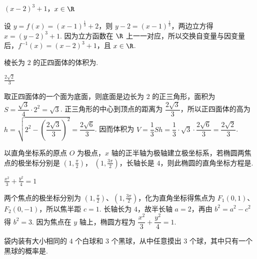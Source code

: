 \begin{answer}
\((x-2)^3+1\)，\(x\in\R\)
\end{answer}

\begin{solution}
设 \(y=f(x)=(x-1)^{\frac13}+2\)，则 \(y-2=(x-1)^{\frac13}\)，两边立方得 \(x=(y-2)^3+1\). 因为立方函数在 \(\R\) 上一一对应，所以交换自变量与因变量后，\(f^{-1}(x)=(x-2)^3+1\)，且 \(x\in\R\).
\end{solution}

\begin{problem}
棱长为 \(2\) 的正四面体的体积为\fillinblank{}.
\end{problem}

\begin{answer}
\(\frac{2\sqrt{2}}{3}\)
\end{answer}

\begin{solution}
取正四面体的一个面为底面，则底面是边长为 \(2\) 的正三角形，面积为 \(S=\dfrac{\sqrt3}{4}\cdot2^2=\sqrt3\). 正三角形的中心到顶点的距离为 \(\dfrac{2\sqrt3}{3}\)，所以正四面体的高为
\(h=\sqrt{2^2-\left(\dfrac{2\sqrt3}{3}\right)^2}=\dfrac{2\sqrt6}{3}\). 因而体积为 \(V=\dfrac13Sh=\dfrac13\cdot\sqrt3\cdot\dfrac{2\sqrt6}{3}=\dfrac{2\sqrt2}{3}\).
\end{solution}

\begin{problem}
以直角坐标系的原点 \(O\) 为极点，\(x\) 轴的正半轴为极轴建立极坐标系，若椭圆两焦点的极坐标分别是 \(\left(1, \frac{\pi}{2}\right) \)， \(\left(1, \frac{3\pi}{2}\right) \)，长轴长是 \(4\)，则此椭圆的直角坐标方程是\fillinblank{}.
\end{problem}

\begin{answer}
\(\frac{x^2}{3}+\frac{y^2}{4}=1\)
\end{answer}

\begin{solution}
两个焦点的极坐标分别为 \(\left(1,\frac{\pi}{2}\right)\)、\(\left(1,\frac{3\pi}{2}\right)\)，化为直角坐标得焦点为 \(F_1(0,1)\)、\(F_2(0,-1)\)，所以焦半距 \(c=1\). 长轴长为 \(4\)，故半长轴 \(a=2\)，再由 \(b^2=a^2-c^2\) 得 \(b^2=3\). 因为焦点在 \(y\) 轴上，椭圆方程为 \(\dfrac{x^2}{3}+\dfrac{y^2}{4}=1\).
\end{solution}

\begin{problem}
袋内装有大小相同的 \(4\) 个白球和 \(3\) 个黑球，从中任意摸出 \(3\) 个球，其中只有一个黑球的概率是\fillinblank{}.
\end{problem}

